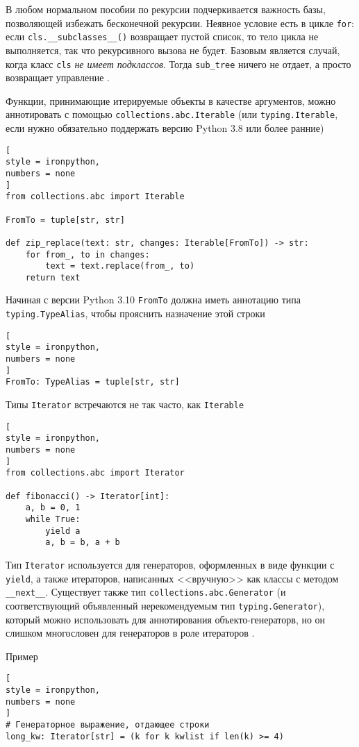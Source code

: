 \documentclass[%
	11pt,
	a4paper,
	utf8,
		]{article}
\begin{document}
В любом нормальном пособии по рекурсии подчеркивается важность базы, позволяющей избежать бесконечной рекурсии. Неявное условие есть в цикле \verb|for|: если \verb*|cls.__subclasses__()| возвращает пустой список, то тело цикла не выполняется, так что рекурсивного вызова не будет. Базовым является случай, когда класс \verb|cls| \emph{не имеет подклассов}. Тогда \verb*|sub_tree| ничего не отдает, а просто возвращает управление \cite[]{ramalho:python-2022}.

Функции, принимающие итерируемые объекты в качестве аргументов, можно аннотировать с помощью \verb|collections.abc.Iterable| (или \verb*|typing.Iterable|, если нужно обязательно поддержать версию Python 3.8 или более ранние)
\begin{lstlisting}[
style = ironpython,
numbers = none	
]
from collections.abc import Iterable

FromTo = tuple[str, str]

def zip_replace(text: str, changes: Iterable[FromTo]) -> str:
    for from_, to in changes:
        text = text.replace(from_, to)
    return text
\end{lstlisting}

Начиная с версии Python 3.10 \verb|FromTo| должна иметь аннотацию типа \verb*|typing.TypeAlias|, чтобы прояснить назначение этой строки
\begin{lstlisting}[
style = ironpython,
numbers = none
]
FromTo: TypeAlias = tuple[str, str]
\end{lstlisting}

Типы \verb|Iterator| встречаются не так часто, как \verb*|Iterable|
\begin{lstlisting}[
style = ironpython,
numbers = none
]
from collections.abc import Iterator

def fibonacci() -> Iterator[int]:
    a, b = 0, 1
    while True:
        yield a
        a, b = b, a + b
\end{lstlisting}

Тип \verb|Iterator| используется для генераторов, оформленных в виде функции с \verb*|yield|, а также итераторов, написанных <<вручную>> как классы с методом \verb*|__next__|. Существует также тип \verb|collections.abc.Generator| (и соответствующий объявленный {\color{red}нерекомендуемым тип \verb|typing.Generator|}), который можно использовать для аннотирования объекто-генераторв, но он слишком многословен для генераторов в роле итераторов \cite[]{ramalho:python-2022}.

Пример
\begin{lstlisting}[
style = ironpython,
numbers = none
]
# Генераторное выражение, отдающее строки
long_kw: Iterator[str] = (k for k kwlist if len(k) >= 4)
\end{lstlisting}
\end{document}

